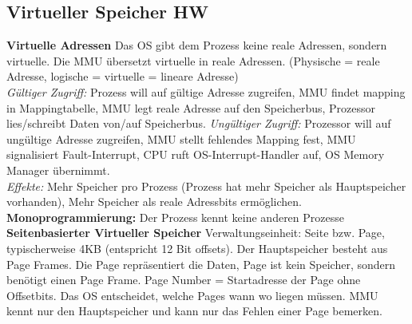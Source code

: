 \documentclass[7pt,landscape,a4paper]{scrartcl}
\begin{document}
\begin{multicols*}{4}
\subsection{Virtueller Speicher HW}
\vspace{-0.75em}
\textbf{Virtuelle Adressen} Das OS gibt dem Prozess keine reale Adressen, sondern virtuelle. Die MMU übersetzt virtuelle in reale Adressen. (Physische = reale Adresse, logische = virtuelle = lineare Adresse) \\
\textit{Gültiger Zugriff:} Prozess will auf gültige Adresse zugreifen, MMU findet mapping in Mappingtabelle, MMU legt reale Adresse auf den Speicherbus, Prozessor lies/schreibt Daten von/auf Speicherbus. \textit{Ungültiger Zugriff:} Prozessor will auf ungültige Adresse zugreifen, MMU stellt fehlendes Mapping fest, MMU signalisiert Fault-Interrupt, CPU ruft OS-Interrupt-Handler auf, OS Memory Manager übernimmt.\\
\textit{Effekte:} Mehr Speicher pro Prozess (Prozess hat mehr Speicher als Hauptspeicher vorhanden), Mehr Speicher als reale Adressbits ermöglichen.\\
\textbf{Monoprogrammierung:} Der Prozess kennt keine anderen Prozesse\\
\textbf{Seitenbasierter Virtueller Speicher}
Verwaltungseinheit: Seite bzw. Page, typischerweise 4KB (entspricht 12 Bit offsets). Der Hauptspeicher besteht aus Page Frames. Die Page repräsentiert die Daten, Page ist kein Speicher, sondern benötigt einen Page Frame. Page Number = Startadresse der Page ohne Offsetbits. Das OS entscheidet, welche Pages wann wo liegen müssen. MMU kennt nur den Hauptspeicher und kann nur das Fehlen einer Page bemerken.\\

\end{multicols*}
\end{document}
